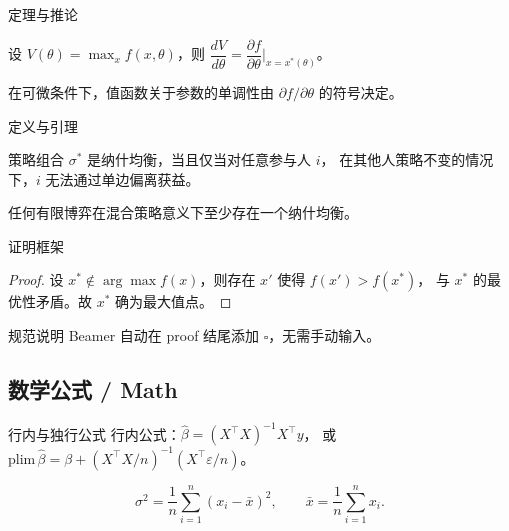 \begin{frame}{定理与推论}
  \begin{theorem}[包络定理]
    设 $V(\theta) = \max_x f(x, \theta)$，则
    $\dfrac{dV}{d\theta} = \dfrac{\partial f}{\partial \theta}\big|_{x=x^*(\theta)}$。
  \end{theorem}
  \begin{corollary}
    在可微条件下，值函数关于参数的单调性由 $\partial f/\partial\theta$ 的符号决定。
  \end{corollary}
\end{frame}

\begin{frame}{定义与引理}
  \begin{definition}[纳什均衡]
    策略组合 $\sigma^*$ 是纳什均衡，当且仅当对任意参与人 $i$，
    在其他人策略不变的情况下，$i$ 无法通过单边偏离获益。
  \end{definition}
  \begin{lemma}
    任何有限博弈在混合策略意义下至少存在一个纳什均衡。
  \end{lemma}
\end{frame}

\begin{frame}{证明框架}
  \begin{proof}
    设 $x^* \notin \arg\max f(x)$，则存在 $x'$ 使得 $f(x') > f(x^*)$，
    与 $x^*$ 的最优性矛盾。故 $x^*$ 确为最大值点。
  \end{proof}
  \medskip
  \begin{exampleblock}{规范说明}
    Beamer 自动在 proof 结尾添加 $\square$，无需手动输入。
  \end{exampleblock}
\end{frame}

\subsection{数学公式 / Math}

\begin{frame}{行内与独行公式}
  行内公式：$\hat{\beta} = (X^\top X)^{-1} X^\top y$，
  或 $\text{plim}\,\hat{\beta} = \beta + (X^\top X/n)^{-1}(X^\top \varepsilon/n)$。

  \[
    \sigma^2 = \frac{1}{n}\sum_{i=1}^{n}(x_i - \bar{x})^2, \qquad
    \bar{x} = \frac{1}{n}\sum_{i=1}^{n} x_i.
  \]
\end{frame}

